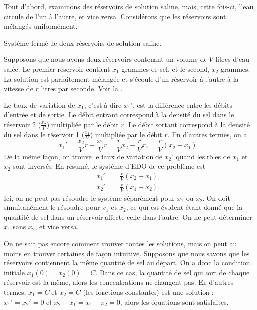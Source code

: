 \begin{example} \label{sintro:closedbrine-example}
Tout d'abord, examinons des réservoirs de solution saline, mais, cette fois-ci, l'eau circule de l'un à l'autre, et vice versa. Considérons que les réservoirs sont mélangés uniformément.

\begin{myfig}
\capstart
{}
\caption{Système fermé de deux réservoirs de solution saline.\label{sintro:closedbrine}}
\end{myfig}

Supposons que nous avons deux réservoirs contenant un volume de $V$ litres d'eau salée. Le premier réservoir contient $x_1$ grammes de sel, et le second, $x_2$ grammes. La solution est parfaitement mélangée et s'écoule d'un réservoir à l'autre à la vitesse de $r$ litres par seconde. Voir la .

Le taux de variation de $x_1$,
c'est-à-dire $x_1'$, est la différence entre les débits d'entrée et de sortie. Le débit entrant correspond à la densité du sel dans le réservoir 2 ($\frac{x_2}{V}$) multipliée par le débit $r$.
Le débit sortant correspond à la densité du sel dans le réservoir 1 ($\frac{x_1}{V}$) multipliée par le débit $r$.
En d'autres termes, on a
\begin{equation*}
x_1' = \frac{x_2}{V} r - \frac{x_1}{V} r =
\frac{r}{V} x_2 - \frac{r}{V} x_1 = \frac{r}{V} (x_2-x_1).
\end{equation*}
De la même façon, on trouve le taux de variation de $x_2'$ quand les rôles de $x_1$ et $x_2$
sont inversés. En résumé, le système d'EDO de ce problème est
\begin{align*}
x_1' & = \frac{r}{V} (x_2-x_1), \\
x_2' & = \frac{r}{V} (x_1-x_2).
\end{align*}
Ici, on ne peut pas résoudre le système séparément pour $x_1$ ou $x_2$. On doit simultanément le résoudre pour $x_1$ et $x_2$, ce qui est évident étant donné que la quantité de sel dans un réservoir affecte celle dans l'autre. On ne peut déterminer $x_1$ sans $x_2$, et vice versa.

On ne sait pas encore comment trouver toutes les solutions, mais on peut au moins en trouver certaines de façon intuitive. Supposons que nous savons que les réservoirs contiennent la même quantité de sel au départ. On a donc la condition initiale $x_1(0)=x_2(0) = C$. Dans ce cas, la quantité de sel qui sort de chaque réservoir est la même, alors les concentrations ne changent pas. En d'autres termes, $x_1 = C$ et $x_2 = C$ (les fonctions constantes) est une solution : $x_1' = x_2' = 0$ et
$x_2-x_1 = x_1-x_2 = 0$, alors les équations sont satisfaites.


\end{example}
